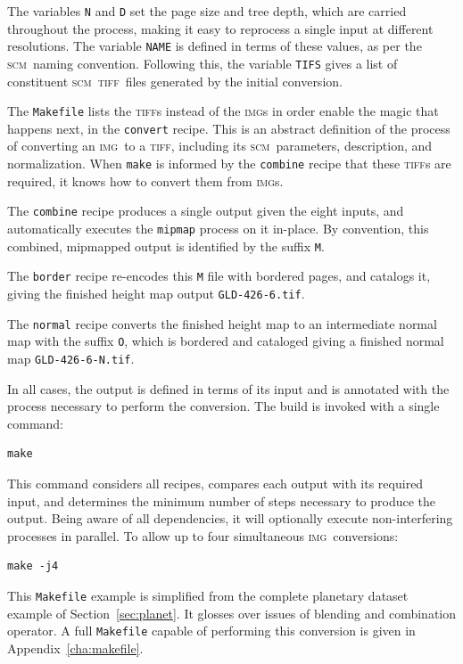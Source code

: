 \documentclass[oneside,10pt]{memoir}
\newcommand{\scm}     {\textsc{scm}}
\newcommand{\tiff}    {\textsc{tiff}}
\newcommand{\img}     {\textsc{img}}
\begin{document}
\begin{Spacing}{1.1}
The variables \texttt{N} and \texttt{D} set the page size and tree depth, which are
carried throughout the process, making it easy to reprocess a single input at different resolutions. The variable \texttt{NAME} is defined in terms of these values, as per the \scm\ naming convention. Following this, the variable \texttt{TIFS} gives a list of constituent \scm\ \tiff\ files generated by the initial conversion.

The \texttt{Makefile} lists the \tiff s instead of the \img s in order enable the magic that happens next, in the \texttt{convert} recipe. This is an abstract definition of the process of converting an \img\ to a \tiff, including its \scm\ parameters, description, and normalization. When \texttt{make} is informed by the \texttt{combine} recipe that these \tiff s are required, it knows how to convert them from \img s.

The \texttt{combine} recipe produces a single output given the eight inputs, and automatically executes the \texttt{mipmap} process on it in-place. By convention, this combined, mipmapped output is identified by the suffix \texttt{M}.

The \texttt{border} recipe re-encodes this \texttt{M} file with bordered pages, and catalogs it, giving the finished height map output \texttt{GLD-426-6.tif}.

The \texttt{normal} recipe converts the finished height map to an intermediate normal map with the suffix \texttt{O}, which is bordered and cataloged giving a finished normal map \texttt{GLD-426-6-N.tif}.

In all cases, the output is defined in terms of its input and is annotated with the process necessary to perform the conversion. The build is invoked with a single command:

\begin{Verbatim}
make
\end{Verbatim}

This command considers all recipes, compares each output with its required input, and determines the minimum number of steps necessary to produce the output. Being aware of all dependencies, it will optionally execute non-interfering processes in parallel. To allow up to four simultaneous \img\ conversions:

\begin{Verbatim}
make -j4
\end{Verbatim}

This \texttt{Makefile} example is simplified from the complete planetary dataset example of Section~\ref{sec:planet}. It glosses over issues of blending and combination operator. A full \texttt{Makefile} capable of performing this conversion is given in Appendix~\ref{cha:makefile}.


\end{Spacing}
\end{document}
